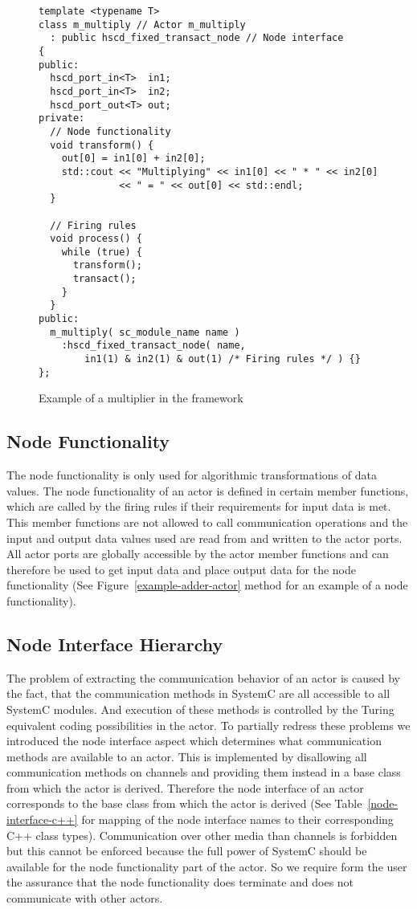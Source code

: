 \begin{figure}
\centering
\begin{verbatim}
template <typename T>
class m_multiply // Actor m_multiply
  : public hscd_fixed_transact_node // Node interface
{
public:
  hscd_port_in<T>  in1;
  hscd_port_in<T>  in2;
  hscd_port_out<T> out;
private:
  // Node functionality
  void transform() {
    out[0] = in1[0] + in2[0];
    std::cout << "Multiplying" << in1[0] << " * " << in2[0]
              << " = " << out[0] << std::endl;
  }
  
  // Firing rules
  void process() {
    while (true) {
      transform();
      transact();
    }
  }
public:
  m_multiply( sc_module_name name )
    :hscd_fixed_transact_node( name,
        in1(1) & in2(1) & out(1) /* Firing rules */ ) {}
};
\end{verbatim}
\caption{\label{example-multiply-actor}Example of a multiplier in the \SysteMoC{} framework}
\end{figure}

\subsection{Node Functionality}
The node functionality is only used for algorithmic transformations of data values.
The node functionality of an actor is defined in certain member functions,
which are called by the firing rules if their requirements for input data is met.
This member functions are not allowed to call communication operations and
the input and output data values used are read from
and written to the actor ports. All actor ports are globally accessible
by the actor member functions and can therefore be used to get input data
and place output data for the node functionality
(See Figure~\ref{example-adder-actor} method  for an example of a node functionality).

\subsection{Node Interface Hierarchy}
The problem of extracting the communication behavior of an actor is caused by the fact,
that the communication methods in SystemC are all accessible to all SystemC modules.
And execution of these methods is controlled by the Turing equivalent coding possibilities
in the actor. To partially redress these problems we introduced the node interface aspect
which determines what communication methods are available to an actor. This is implemented
by disallowing all communication methods on \SysteMoC{} channels and providing them instead
in a base class from which the actor is derived. Therefore the node interface of an actor
corresponds to the base class from which the actor is derived
(See Table~\ref{node-interface-c++} for mapping of the node interface names to their
corresponding C++ class types).
Communication over other media than \SysteMoC{} channels is forbidden but this cannot be enforced
because the full power of SystemC should be available for the node functionality part
of the actor. So we require form the \SysteMoC{} user the assurance that the
node functionality does terminate and does not communicate with other actors.

